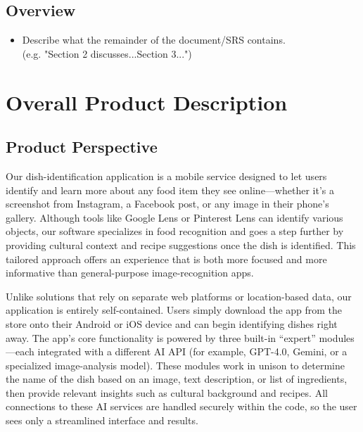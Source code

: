 \documentclass[]{article}
\begin{document}

\renewcommand{\refname}{}  %
\vspace{-7mm}  %


\subsection{Overview}
\label{sub:overview}
\begin{itemize}
	\item Describe what the remainder of the document/SRS contains.\\
	(e.g. "Section 2 discusses...Section 3...")
\end{itemize}


\section{Overall Product Description}
\label{sec:overall_description}

\subsection{Product Perspective}
\label{sub:product_perspective}

Our dish-identification application is a mobile service designed to let users identify and learn more about any food item they see online—whether it’s a screenshot from Instagram, a Facebook post, or any image in their phone’s gallery. Although tools like Google Lens or Pinterest Lens can identify various objects, our software specializes in food recognition and goes a step further by providing cultural context and recipe suggestions once the dish is identified. This tailored approach offers an experience that is both more focused and more informative than general-purpose image-recognition apps.

Unlike solutions that rely on separate web platforms or location-based data, our application is entirely self-contained. Users simply download the app from the store onto their Android or iOS device and can begin identifying dishes right away. The app’s core functionality is powered by three built-in “expert” modules—each integrated with a different AI API (for example, GPT-4.0, Gemini, or a specialized image-analysis model). These modules work in unison to determine the name of the dish based on an image, text description, or list of ingredients, then provide relevant insights such as cultural background and recipes. All connections to these AI services are handled securely within the code, so the user sees only a streamlined interface and results.
\end{document}
